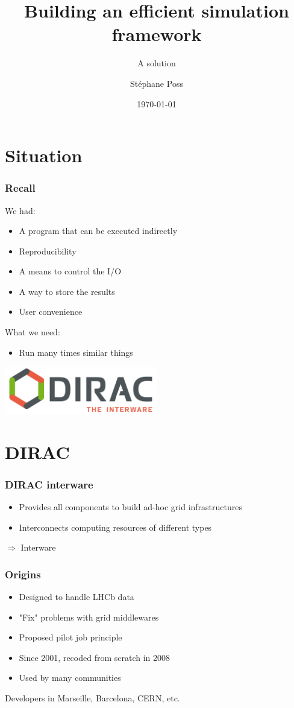 \documentclass[14pt]{beamer}
\title{Building an efficient simulation framework}
\subtitle{A solution}
\author{St\'ephane Poss}
\date{\today}
\begin{document}
\begin{frame}[plain]
\titlepage
\end{frame}

\begin{frame}
\tableofcontents
\end{frame}

\section{Situation}
\begin{frame}
\frametitle{Recall}
We had:
\begin{itemize}
\item A program that can be executed indirectly
\item Reproducibility
\item A means to control the I/O
\item A way to store the results
\item User convenience
\end{itemize}
What we need:
\begin{itemize}
\item Run many times similar things
\end{itemize}

\centering
\includegraphics[width=0.5\textwidth]{Dirac_logo_RGB.png}

\end{frame}

\section{DIRAC}
\begin{frame}
\frametitle{DIRAC interware}
\begin{itemize}
\item Provides all components to build ad-hoc grid infrastructures
\pause
\item Interconnects computing resources of different types
\end{itemize}
\pause
\alert{$\Rightarrow$ Interware}
\end{frame}

\begin{frame}
\frametitle{Origins}
\begin{itemize}
\item Designed to handle LHCb data
\item "Fix" problems with grid middlewares
\item Proposed pilot job principle
\item Since 2001, recoded from scratch in 2008
\item Used by many communities
\end{itemize}
Developers in Marseille, Barcelona, CERN, etc.
\end{frame}
\end{document}
